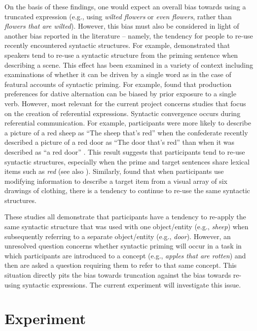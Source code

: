 \documentclass[output=paper]{langsci/langscibook}
\begin{document}
On the basis of these findings, one would expect an overall bias
towards using a truncated expression (e.g., using \textit{wilted
  flowers} or \textit{even flowers}, rather than \textit{flowers that
  are wilted}).  However, this bias must also be considered in light
of another bias reported in the literature -- namely, the tendency for
people to re-use recently encountered syntactic structures. For
example, \citet{bock1986syntactic} demonstrated that speakers tend to re-use a
syntactic structure from the priming sentence when describing a
scene. This effect has been examined in a variety of context including
examinations of whether it can be driven by a single word as in the
case of featural accounts of syntactic priming. For example, \citet{melinger2005lexically} found that production preferences for dative
alternation can be biased by prior exposure to a single verb. However,
most relevant for the current project concerns studies that focus on
the creation of referential expressions. Syntactic convergence occurs
during referential communication. For example, participants were more
likely to describe a picture of a red sheep as “The sheep that’s red”
when the confederate recently described a picture of a red door as
“The door that’s red” than when it was described as “a red door” \citep{cleland2003use}. This result suggests that participants
tend to re-use syntactic structures, especially when the prime and
target sentences share lexical items such as \textit{red} (see also
\citealt{chang2003can}). Similarly, \citet{tarenskeen2015overspecification} found that when participants use modifying information
to describe a target item from a visual array of six drawings of
clothing, there is a tendency to continue to re-use the same syntactic
structures.

These studies all demonstrate that participants have a tendency to
re-apply the same syntactic structure that was used with one
object/entity (e.g., \textit{sheep}) when subsequently referring to a
separate object/entity (e.g., \textit{door}). However, an unresolved
question concerns whether syntactic priming will occur in a task in
which participants are introduced to a concept (e.g., \textit{apples
  that are rotten}) and then are asked a question requiring them to
refer to that same concept.  This situation directly pits the bias
towards truncation against the bias towards re-using syntactic
expressions. The current experiment will investigate this issue.


\section{Experiment}
\end{document}
